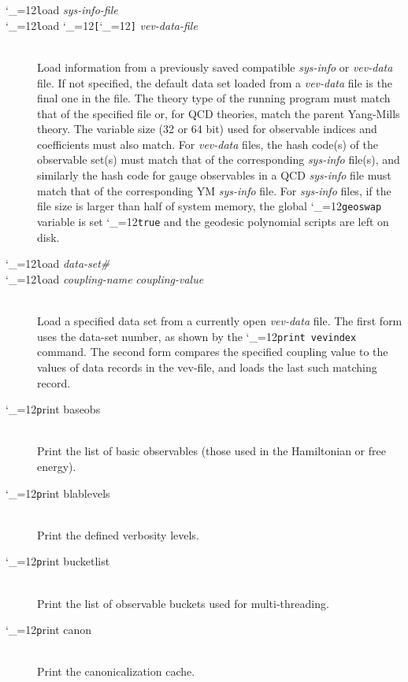 \documentclass [12pt]{article}
\makeatletter
\renewcommand{\tt}{\begingroup\catcode`_=12\def\_{\string_}\tt@}
\newcommand{\tt@}[1]{\texttt{#1}\endgroup}
\makeatother
\begin{document}
\begin{description}
\item [\tt load {\it sys-info-file}] \bgroup \itemsep 0pt \parskip 0pt
\item [\tt load \tt{[}{\it data-set\#}\tt{]} {\it vev-data-file}]~\\
    Load information from a previously saved compatible \textit{sys-info}
    or \textit{vev-data} file.
    If not specified, the default data set loaded from a \textit{vev-data} file
    is the final one in the file.
    The theory type of the running program must match that of the specified file
    or, for QCD theories, match the parent Yang-Mills theory.
    The variable size (32 or 64 bit) used for observable indices and coefficients
    must also match.
    For \textit{vev-data} files, the hash code(s) of the observable set(s)
    must match that of the corresponding \textit{sys-info} file(s), and similarly
    the hash code for gauge observables in a QCD \textit{sys-info} file must match
    that of the corresponding YM \textit{sys-info} file.
    For \textit{sys-info} files, if the file size is larger than half of system memory,
    the global \tt{geoswap} variable is set \tt{true} and the geodesic polynomial
    scripts are left on disk.
\egroup

\item [\tt load {\it data-set\#}] \bgroup \itemsep 0pt \parskip 0pt
\item [\tt load {\it coupling-name} {\it coupling-value}]~\\
    Load a specified data set from a currently open \textit{vev-data} file.
    The first form uses the data-set number, as shown by the
    \tt{print vevindex} command.
    The second form compares the specified coupling value to the
    values of data records in the vev-file, and loads the last
    such matching record.
\egroup

\item [\tt print baseobs]~\\
    Print the list of basic observables (those used in the
    Hamiltonian or free energy).

\item [\tt print blablevels]~\\
    Print the defined verbosity levels.

\item [\tt print bucketlist]~\\
    Print the list of observable buckets used
    for multi-threading.

\item [\tt print canon]~\\
    Print the canonicalization cache.


\end{description}
\end{document}
